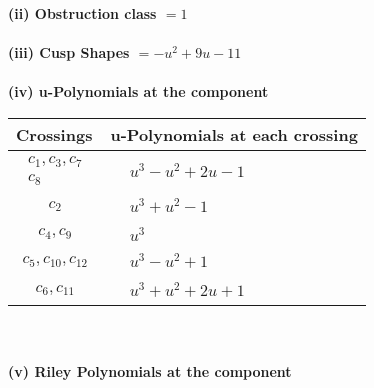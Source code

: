 \documentclass[1p]{elsarticle_modified}
\theoremstyle{definition}
\begin{document}
\flushleft \textbf{(ii) Obstruction class $= 1$}\\~\\
\flushleft \textbf{(iii) Cusp Shapes $= - u^2+9 u-11$}\\~\\
\newpage\renewcommand{\arraystretch}{1}
\flushleft \textbf{(iv) u-Polynomials at the component}\newline \\
\begin{tabular}{m{50pt}|m{274pt}}
Crossings & \hspace{64pt}u-Polynomials at each crossing \\
\hline $$\begin{aligned}c_{1},c_{3},c_{7}\\c_{8}\end{aligned}$$&$\begin{aligned}
&u^3- u^2+2 u-1
\end{aligned}$\\
\hline $$\begin{aligned}c_{2}\end{aligned}$$&$\begin{aligned}
&u^3+u^2-1
\end{aligned}$\\
\hline $$\begin{aligned}c_{4},c_{9}\end{aligned}$$&$\begin{aligned}
&u^3
\end{aligned}$\\
\hline $$\begin{aligned}c_{5},c_{10},c_{12}\end{aligned}$$&$\begin{aligned}
&u^3- u^2+1
\end{aligned}$\\
\hline $$\begin{aligned}c_{6},c_{11}\end{aligned}$$&$\begin{aligned}
&u^3+u^2+2 u+1
\end{aligned}$\\
\hline
\end{tabular}\\~\\
\newpage\renewcommand{\arraystretch}{1}
\flushleft \textbf{(v) Riley Polynomials at the component}\newline \\
\end{document}
